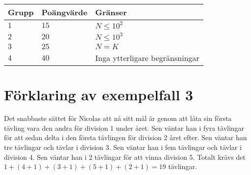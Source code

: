 \noindent
\begin{tabular}{| l | l | l |}
\hline
Grupp & Poängvärde & Gränser \\ \hline
$1$    & $15$         & $N \leq 10^2$ \\ \hline
$2$    & $20$         & $N \leq 10^3$ \\ \hline
$3$    & $25$         & $N = K$ \\ \hline
$4$    & $40$         & Inga ytterligare begränsningar\\ \hline
\end{tabular}

\section*{Förklaring av exempelfall 3}
Det snabbaste sättet för Nicolas att nå sitt mål är genom att låta sin första tävling vara den andra för division 1 under året.
Sen väntar han i fyra tävlingar för att sedan delta i den första tävlingen för division 2 året efter.
Sen väntar han tre tävlingar och tävlar i division 3.
Sen väntar han i fem tävlingar och tävlar i division 4.
Sen väntar han i 2 tävlingar för att vinna division 5.
Totalt krävs det $1+(4+1)+(3+1)+(5+1)+(2+1) = 19$ tävlingar.
